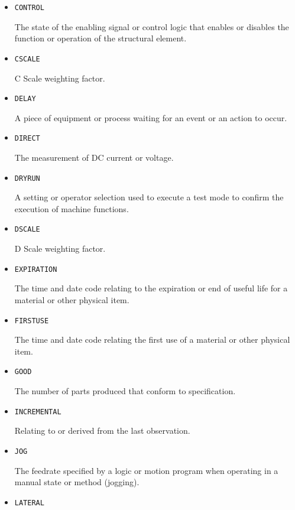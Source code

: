 \begin{itemize}
\item \texttt{CONTROL}  

The state of the enabling signal or control logic that enables or disables the function or operation of the structural element.


\item \texttt{C\textunderscore SCALE}  

C Scale weighting factor.


\item \texttt{DELAY}  

A piece of equipment or process waiting for an event or an action to occur.


\item \texttt{DIRECT}  

The measurement of DC current or voltage.


\item \texttt{DRY\textunderscore RUN}  

A setting or operator selection used to execute a test mode to confirm the execution of machine functions.


\item \texttt{D\textunderscore SCALE}  

D Scale weighting factor.


\item \texttt{EXPIRATION}  

The time and date code relating to the expiration or end of useful life for a material or other physical item.


\item \texttt{FIRST\textunderscore USE}  

The time and date code relating the first use of a material or other physical item.


\item \texttt{GOOD}  

The number of parts produced that conform to specification.


\item \texttt{INCREMENTAL}  

Relating to or derived from the last \gls{observation}.


\item \texttt{JOG}  

The feedrate specified by a logic or motion program when operating in a manual state or method (jogging).


\item \texttt{LATERAL}  


\end{itemize}
